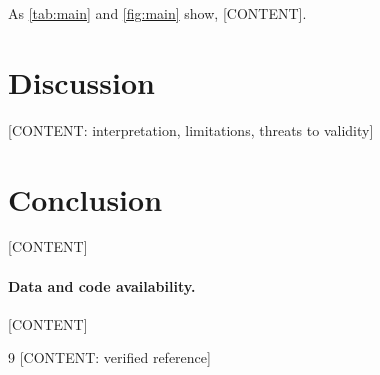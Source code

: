 \documentclass[11pt,a4paper]{article}
\begin{document}
As \cref{tab:main} and \cref{fig:main} show, [CONTENT].

\section{Discussion}\label{sec:discussion}
{}[CONTENT: interpretation, limitations, threats to validity]

\section{Conclusion}
{}[CONTENT]

\paragraph{Data and code availability.} [CONTENT]

\begin{thebibliography}{9}
 [CONTENT: verified reference]
\end{thebibliography}
\end{document}
